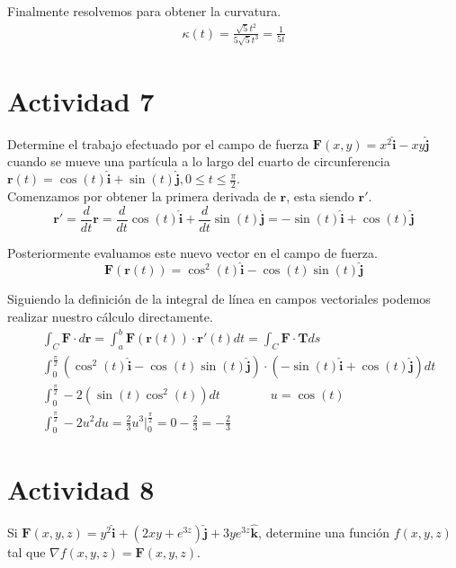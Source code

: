 \documentclass{article}
\begin{document}
Finalmente resolvemos para obtener la curvatura.
\begin{equation*}
    \begin{split}
        \kappa(t) = \frac{\sqrt{5}t^2}{5\sqrt{5}t^3} = \frac{1}{5t}
    \end{split}
\end{equation*}
\newpage
\section{Actividad 7}
Determine el trabajo efectuado por el campo de fuerza $\pmb{F}(x,y)=x^2\pmb{\hat{i}}
-xy\pmb{\hat{j}}$ cuando se mueve una partícula a lo largo del cuarto de
circunferencia $\pmb{r}(t)=\cos(t)\pmb{\hat{i}}+\sin(t)\pmb{\hat{j}}, 
0 \leqslant t \leqslant \frac{\pi}{2}.$\\

Comenzamos por obtener la primera derivada de $\pmb{r}$, esta siendo $\pmb{r'}$.\\
\begin{equation*}
    \pmb{r'}=\frac{d}{dt}\pmb{r}=\frac{d}{dt}\cos(t)\pmb{\hat{i}}+\frac{d}{dt}\sin(t)
    \pmb{\hat{j}}=-\sin(t)\pmb{\hat{i}}+\cos(t)\pmb{\hat{j}}
\end{equation*}

Posteriormente evaluamos este nuevo vector en el campo de fuerza.
\begin{equation*}
    \pmb{F}(\pmb{r}(t))=\cos^2(t)\pmb{\hat{i}}-\cos(t)\sin(t)\pmb{\hat{j}}
\end{equation*}

Siguiendo la definición de la integral de línea en campos vectoriales podemos realizar
nuestro cálculo directamente.
\begin{equation*}
    \begin{split}
        &\int_{C}\pmb{F}\cdot d\pmb{r}=\int_{a}^{b}\pmb{F}(\pmb{r}(t))\cdot \pmb{r'}
    (t)dt =\int_{C}\pmb{F}\cdot\pmb{T}ds\\
        &\int_{0}^{\frac{\pi}{2}}(\cos^2(t)\pmb{\hat{i}}-\cos(t)\sin(t)\pmb{\hat{j}})
        \cdot(-\sin(t)\pmb{\hat{i}}+\cos(t)\pmb{\hat{j}})dt\\
        &\int_{0}^{\frac{\pi}{2}}-2(\sin(t)\cos^2(t))dt \qquad\qquad u=\cos(t)\\
        &\int_{0}^{\frac{\pi}{2}}-2u^2du=\frac{2}{3}u^3\Big|_{0}^{\frac{\pi}{2}}=0-\frac{2}{3}=-\frac{2}{3}
    \end{split}
\end{equation*}
\newpage
\section{Actividad 8}
Si $\pmb{F}(x,y,z)=y^2\pmb{\hat{i}}+(2xy+e^{3z})\pmb{\hat{j}}+3ye^{3z}\pmb{\hat{k}}$, determine una función 
$f(x,y,z)$ tal que $\nabla f(x,y,z) = \pmb{F}(x,y,z)$.\\
\end{document}
